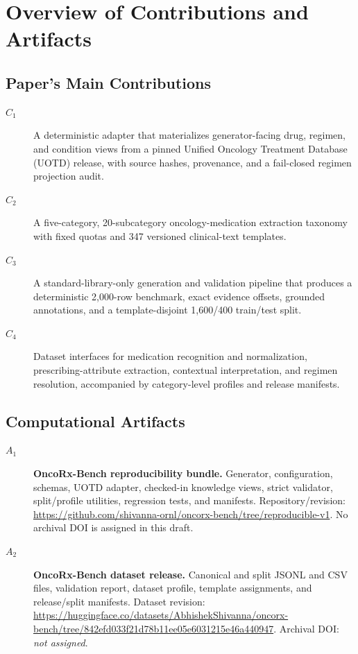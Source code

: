 \documentclass[conference]{IEEEtran}
\newcommand{\CodeRevision}{\url{https://github.com/shivanna-ornl/oncorx-bench/tree/reproducible-v1}}
\newcommand{\DatasetRevision}{\url{https://huggingface.co/datasets/AbhishekShivanna/oncorx-bench/tree/842efd033f21d78b11ee05e6031215e46a440947}}
\newcommand{\DatasetDOI}{\emph{not assigned}}
\begin{document}


\appendixAD

\section{Overview of Contributions and Artifacts}

\subsection{Paper's Main Contributions}

\begin{description}
\item[$C_1$] A deterministic adapter that materializes generator-facing drug,
regimen, and condition views from a pinned Unified Oncology Treatment Database
(UOTD) release, with source hashes, provenance, and a fail-closed regimen
projection audit.

\item[$C_2$] A five-category, 20-subcategory oncology-medication extraction
taxonomy with fixed quotas and 347 versioned clinical-text templates.

\item[$C_3$] A standard-library-only generation and validation pipeline that
produces a deterministic 2,000-row benchmark, exact evidence offsets, grounded
annotations, and a template-disjoint 1,600/400 train/test split.

\item[$C_4$] Dataset interfaces for medication recognition and normalization,
prescribing-attribute extraction, contextual interpretation, and regimen
resolution, accompanied by category-level profiles and release manifests.
\end{description}

\subsection{Computational Artifacts}

\begin{description}
\item[$A_1$] \textbf{OncoRx-Bench reproducibility bundle.} Generator,
configuration, schemas, UOTD adapter, checked-in knowledge views, strict
validator, split/profile utilities, regression tests, and manifests.
Repository/revision: \CodeRevision. No archival DOI is assigned in this draft.

\item[$A_2$] \textbf{OncoRx-Bench dataset release.} Canonical and split JSONL
and CSV files, validation report, dataset profile, template assignments, and
release/split manifests. Dataset revision: \DatasetRevision. Archival DOI:
\DatasetDOI.
\end{description}
\end{document}
